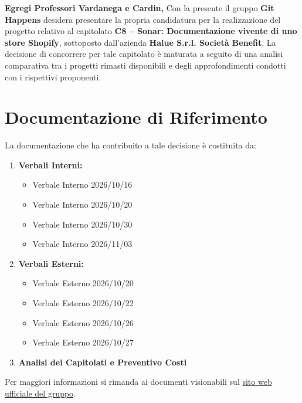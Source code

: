 \noindent
\textbf{Egregi Professori Vardanega e Cardin,}
\vspace{0.3cm}
\noindent
Con la presente il gruppo \textbf{Git Happens} desidera presentare la propria candidatura per la realizzazione del progetto relativo al capitolato \textbf{C8 -- Sonar: Documentazione vivente di uno store Shopify}, sottoposto dall'azienda \textbf{Halue S.r.l. Societ\`a Benefit}.
\vspace{0.2cm}
\noindent
La decisione di concorrere per tale capitolato \`e maturata a seguito di una analisi comparativa tra i progetti rimasti disponibili e degli approfondimenti condotti con i rispettivi proponenti.
\vspace{0.4cm}
\section*{Documentazione di Riferimento}
La documentazione che ha contribuito a tale decisione \`e costituita da:
\begin{enumerate}
    \item \textbf{Verbali Interni:}
    \begin{itemize}
        \item Verbale Interno 2026/10/16
        \item Verbale Interno 2026/10/20
        \item Verbale Interno 2026/10/30
        \item Verbale Interno 2026/11/03
    \end{itemize}
    \item \textbf{Verbali Esterni:}
    \begin{itemize}
        \item Verbale Esterno 2026/10/20
        \item Verbale Esterno 2026/10/22
        \item Verbale Esterno 2026/10/26
        \item Verbale Esterno 2026/10/27
    \end{itemize}
    \item \textbf{Analisi dei Capitolati e Preventivo Costi}
\end{enumerate}
\noindent
Per maggiori informazioni si rimanda ai documenti visionabili sul \href{https://githappens-team.github.io/}{sito web ufficiale del gruppo}.
\vspace{0.4cm}
